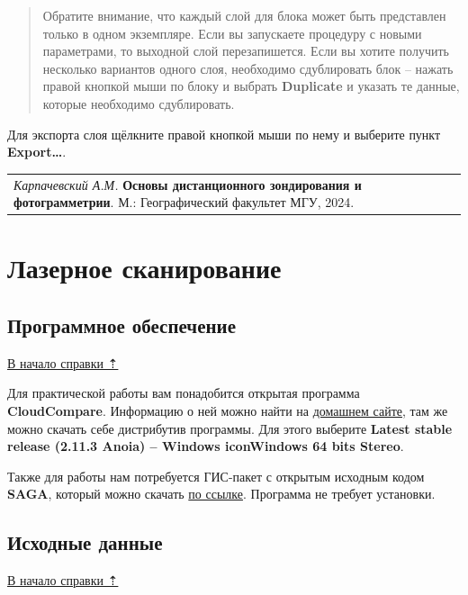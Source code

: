 \documentclass[
  12pt,
]{book}
\begin{document}
\begin{quote}
Обратите внимание, что каждый слой для блока может быть представлен только в одном экземпляре. Если вы запускаете процедуру с новыми параметрами, то выходной слой перезапишется. Если вы хотите получить несколько вариантов одного слоя, необходимо сдублировать блок -- нажать правой кнопкой мыши по блоку и выбрать \textbf{Duplicate} и указать те данные, которые необходимо сдублировать.
\end{quote}

Для экспорта слоя щёлкните правой кнопкой мыши по нему и выберите пункт \textbf{Export\ldots{}}.

\begin{longtable}[]{@{}l@{}}
\toprule\noalign{}
\endhead
\bottomrule\noalign{}
\endlastfoot
\emph{Карпачевский А.М.} \textbf{Основы дистанционного зондирования и фотограмметрии}. М.: Географический факультет МГУ, 2024. \\
\end{longtable}

\hypertarget{las}{%
\chapter{Лазерное сканирование}\label{las}}

\hypertarget{las-soft}{%
\section{Программное обеспечение}\label{las-soft}}

\protect\hyperlink{las}{В начало справки ⇡}

Для практической работы вам понадобится открытая программа \textbf{CloudCompare}. Информацию о ней можно найти на \href{https://www.danielgm.net/cc/}{домашнем сайте}, там же можно скачать себе дистрибутив программы. Для этого выберите \textbf{Latest stable release (2.11.3 Anoia) -- Windows iconWindows 64 bits Stereo}.

Также для работы нам потребуется ГИС-пакет с открытым исходным кодом \textbf{SAGA}, который можно скачать \href{https://sourceforge.net/projects/saga-gis/files/latest/download}{по ссылке}. Программа не требует установки.

\hypertarget{las-initial}{%
\section{Исходные данные}\label{las-initial}}

\protect\hyperlink{las}{В начало справки ⇡}
\end{document}
